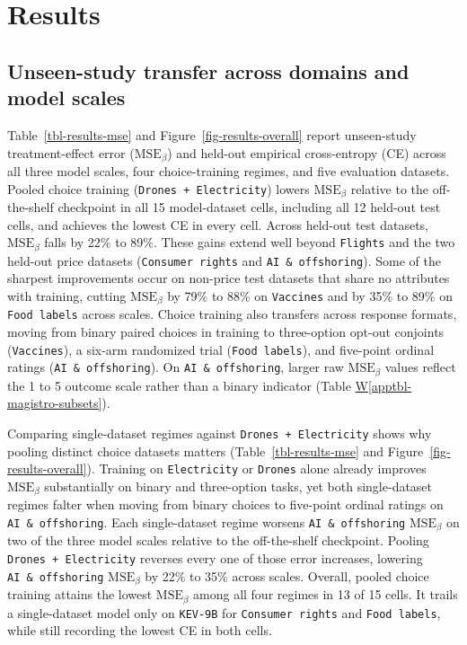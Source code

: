 \documentclass[
  11pt,
  letterpaper,
]{article}
\newcommand*\quartoapptblref[1]{Table \hyperref[#1]{W\ref{#1}}}
\begin{document}
\section{Results}\label{sec-results}

\subsection{Unseen-study transfer across domains and model
scales}\label{unseen-study-transfer-across-domains-and-model-scales}

Table~\ref{tbl-results-mse} and Figure~\ref{fig-results-overall} report
unseen-study treatment-effect error (\(\mathrm{MSE}_\beta\)) and
held-out empirical cross-entropy (CE) across all three model scales,
four choice-training regimes, and five evaluation datasets. Pooled
choice training (\texttt{Drones\ +\ Electricity}) lowers
\(\mathrm{MSE}_\beta\) relative to the off-the-shelf checkpoint in all
15 model-dataset cells, including all 12 held-out test cells, and
achieves the lowest CE in every cell. Across held-out test datasets,
\(\mathrm{MSE}_\beta\) falls by 22\% to 89\%. These gains extend well
beyond \texttt{Flights} and the two held-out price datasets
(\texttt{Consumer\ rights} and \texttt{AI\ \&\ offshoring}). Some of the
sharpest improvements occur on non-price test datasets that share no
attributes with training, cutting \(\mathrm{MSE}_\beta\) by 79\% to 88\%
on \texttt{Vaccines} and by 35\% to 89\% on \texttt{Food\ labels} across
scales. Choice training also transfers across response formats, moving
from binary paired choices in training to three-option opt-out conjoints
(\texttt{Vaccines}), a six-arm randomized trial (\texttt{Food\ labels}),
and five-point ordinal ratings (\texttt{AI\ \&\ offshoring}). On
\texttt{AI\ \&\ offshoring}, larger raw \(\mathrm{MSE}_\beta\) values
reflect the 1 to 5 outcome scale rather than a binary indicator
(\quartoapptblref{apptbl-magistro-subsets}).

Comparing single-dataset regimes against \texttt{Drones\ +\ Electricity}
shows why pooling distinct choice datasets matters
(Table~\ref{tbl-results-mse} and Figure~\ref{fig-results-overall}).
Training on \texttt{Electricity} or \texttt{Drones} alone already
improves \(\mathrm{MSE}_\beta\) substantially on binary and three-option
tasks, yet both single-dataset regimes falter when moving from binary
choices to five-point ordinal ratings on \texttt{AI\ \&\ offshoring}.
Each single-dataset regime worsens \texttt{AI\ \&\ offshoring}
\(\mathrm{MSE}_\beta\) on two of the three model scales relative to the
off-the-shelf checkpoint. Pooling \texttt{Drones\ +\ Electricity}
reverses every one of those error increases, lowering
\texttt{AI\ \&\ offshoring} \(\mathrm{MSE}_\beta\) by 22\% to 35\%
across scales. Overall, pooled choice training attains the lowest
\(\mathrm{MSE}_\beta\) among all four regimes in 13 of 15 cells. It
trails a single-dataset model only on \texttt{KEV-9B} for
\texttt{Consumer\ rights} and \texttt{Food\ labels}, while still
recording the lowest CE in both cells.
\end{document}
